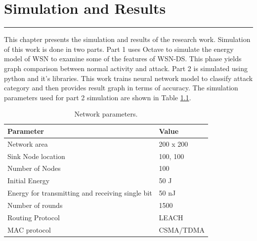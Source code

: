 \chapter{Simulation and Results}
\label{C6} %
\graphicspath{{Figures/PDF/}{Figures/PNG}}
\noindent\rule{\linewidth}{2pt}
This chapter presents the simulation and results of the research work. Simulation of this work is done in two parts. Part 1 uses Octave to simulate the energy model of WSN to examine some of the features of WSN-DS. This phase yields graph comparison between normal activity and attack. Part 2 is simulated using python and it's libraries. This work trains neural network model to classify attack category and then provides result graph in terms of accuracy. The simulation parameters used for part 2 simulation are shown in Table \ref{tab:NetPar}.
\begin{table}[bp]
\centering
\caption{Network parameters.}
\label{tab:NetPar}
\begin{tabular}{|l|l|}
\hline
\textbf{Parameter} & \textbf{Value} \\ \hline
Network area & 200 x 200 \\ \hline
Sink Node location & 100, 100 \\ \hline
Number of Nodes & 100 \\ \hline
Initial Energy & 50 J \\ \hline
Energy for transmitting and receiving single bit & 50 nJ \\ \hline
Number of rounds & 1500 \\ \hline
Routing Protocol & LEACH \\ \hline
MAC protocol & CSMA/TDMA \\ \hline
\end{tabular}%
\end{table}
